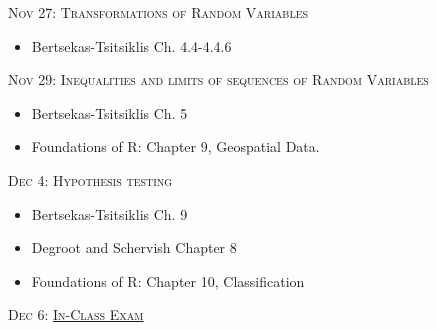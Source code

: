 \documentclass[11pt]{article}
\begin{document}
\noindent \textsc{Nov 27: Transformations of Random Variables}

\begin{itemize}

 \item Bertsekas-Tsitsiklis Ch. 4.4-4.4.6


\end{itemize}

\noindent \textsc{Nov 29: Inequalities and limits of sequences of Random Variables}

\begin{itemize}

 \item Bertsekas-Tsitsiklis Ch. 5
 
  
\item Foundations of R: Chapter 9, Geospatial Data.

\end{itemize}

\noindent \textsc{Dec 4: Hypothesis testing}

\begin{itemize}

 \item Bertsekas-Tsitsiklis Ch. 9
 \item Degroot and Schervish Chapter 8
\item Foundations of R: Chapter 10, Classification
\end{itemize}

\noindent \textsc{Dec 6: \underline{In-Class Exam}}
\end{document}
